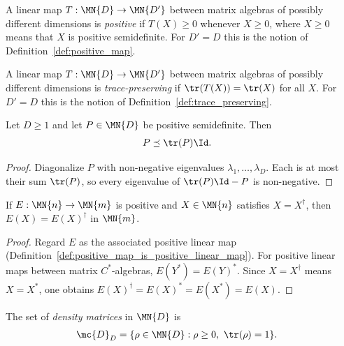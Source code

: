 \begin{definition}
    \label{def:positive_map_rectangular}
    A linear map $T : \MN{D} \to \MN{D'}$ between matrix algebras of
    possibly different dimensions is \emph{positive} if $T(X) \ge 0$
    whenever $X \ge 0$, where $X \ge 0$ means that $X$ is positive
    semidefinite. For $D' = D$ this is the notion of
    Definition~\ref{def:positive_map}.
\end{definition}

\begin{definition}
    \label{def:trace_preserving_rectangular}
    A linear map $T : \MN{D} \to \MN{D'}$ between matrix algebras of
    possibly different dimensions is \emph{trace-preserving} if
    $\tr(T(X)) = \tr(X)$ for all $X$. For $D' = D$ this is the notion of
    Definition~\ref{def:trace_preserving}.
\end{definition}

\begin{theorem}
    \label{thm:psd_le_trace_smul_one}
    \leanok
    Let $D\geq 1$ and let $P\in\MN{D}$ be positive semidefinite. Then
    \begin{align}
        P
         & \preceq \tr(P)\Id.
        \label{eq:channel_psd_trace_bound}
    \end{align}
\end{theorem}

\begin{proof}\leanok
    Diagonalize $P$ with non-negative eigenvalues
    $\lambda_1,\ldots,\lambda_D$. Each is at most their sum $\tr(P)$, so
    every eigenvalue of $\tr(P)\Id-P$ is non-negative.
\end{proof}

\begin{theorem}
    \label{thm:positive_map_preserves_hermitian}
    \leanok
    If $E:\MN{n}\to\MN{m}$ is positive and
    $X\in\MN{n}$ satisfies $X = X^\dagger$, then
    $E(X) = E(X)^\dagger$ in $\MN{m}$.
\end{theorem}

\begin{proof}\leanok
    Regard $E$ as the associated positive linear map
    (Definition~\ref{def:positive_map_is_positive_linear_map}). For positive
    linear maps between matrix $C^*$-algebras, $E(Y^\ast)=E(Y)^\ast$.
    Since $X=X^\dagger$ means $X=X^\ast$, one obtains
    $E(X)^\dagger=E(X)^\ast=E(X^\ast)=E(X)$.
\end{proof}

\begin{definition}\label{def:density_matrices}
    \leanok
    The set of \emph{density matrices} in $\MN{D}$ is
    \begin{align}
        \mc{D}_D
         & =\{\rho \in \MN{D} : \rho \ge 0,\ \tr(\rho) = 1\}.
        \label{eq:channel_density_matrices}
    \end{align}
\end{definition}
